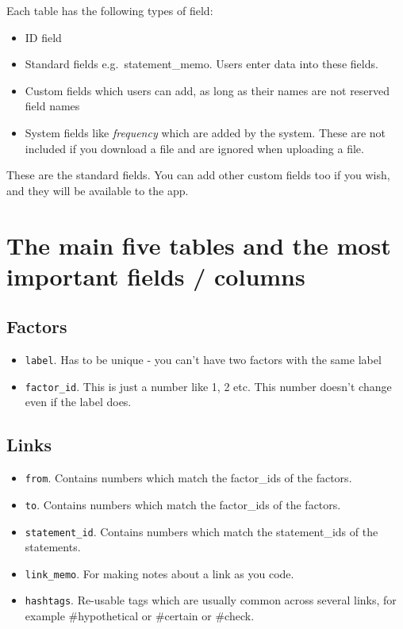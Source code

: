 \documentclass[
]{book}
\providecommand{\tightlist}{%
  \setlength{\itemsep}{0pt}\setlength{\parskip}{0pt}}
\begin{document}
Each table has the following types of field:

\begin{itemize}
\tightlist
\item
  ID field
\item
  Standard fields e.g.~statement\_memo. Users enter data into these fields.
\item
  Custom fields which users can add, as long as their names are not reserved field names
\item
  System fields like \emph{frequency} which are added by the system. These are not included if you download a file and are ignored when uploading a file.
\end{itemize}

These are the standard fields. You can add other custom fields too if you wish, and they will be available to the app.

\hypertarget{the-main-five-tables-and-the-most-important-fields-columns}{%
\section{The main five tables and the most important fields / columns}\label{the-main-five-tables-and-the-most-important-fields-columns}}

\hypertarget{factors}{%
\subsection{Factors}\label{factors}}

\begin{itemize}
\tightlist
\item
  \texttt{label}. Has to be unique - you can't have two factors with the same label
\item
  \texttt{factor\_id}. This is just a number like 1, 2 etc. This number doesn't change even if the label does.
\end{itemize}

\hypertarget{links}{%
\subsection{Links}\label{links}}

\begin{itemize}
\tightlist
\item
  \texttt{from}. Contains numbers which match the factor\_ids of the factors.
\item
  \texttt{to}. Contains numbers which match the factor\_ids of the factors.
\item
  \texttt{statement\_id}. Contains numbers which match the statement\_ids of the statements.
\item
  \texttt{link\_memo}. For making notes about a link as you code.
\item
  \texttt{hashtags}. Re-usable tags which are usually common across several links, for example \#hypothetical or \#certain or \#check.
\end{itemize}
\end{document}
